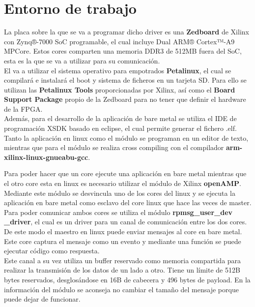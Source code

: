 \documentclass[11pt]{article}
\begin{document}
\section{Entorno de trabajo}

La placa sobre la que se va a programar dicho driver es una \textbf{Zedboard} de Xilinx con Zynq®-7000 SoC programable, el cual incluye Dual ARM® Cortex™-A9 MPCore. Estos cores comparten una memoria DDR3 de 512MB fuera del SoC, esta es la que se va a utilizar para su comunicación.\\

\noindent El va a utilizar el sistema operativo para empotrados \textbf{Petalinux}, el cual se compilará e instalará el boot y sistema de ficheros en un tarjeta SD. Para ello se utilizan las \textbf{Petalinux Tools} proporcionadas por Xilinx, así como el \textbf{Board Support Package} propio de la Zedboard para no tener que definir el hardware de la FPGA. \\

Además, para el desarrollo de la aplicación de bare metal se utiliza el IDE de programación XSDK basado en eclipse, el cual permite generar el fichero .elf. Tanto la aplicación en linux como el módulo se programan en un editor de texto, mientras que para el módulo se realiza cross compiling con el compilador \textbf{arm-xilinx-linux-gnueabu-gcc}.\\

\clearpage

\noindent Para poder hacer que un core ejecute una aplicación en bare metal mientras que el otro core esta en linux es necesario utilizar el módulo de Xilinx \textbf{openAMP}. Mediante este módulo se desvincula uno de los cores del linux y se ejecuta la aplicación en bare metal como esclavo del core linux que hace las veces de master.\\

\noindent Para poder comunicar ambos cores se utiliza el módulo \textbf{rpmsg\_user\_dev \_driver}, el cual es un driver para un canal de comunicación entre los dos cores. De este modo el maestro en linux puede enviar mensajes al core en bare metal. Este core captura el mensaje como un evento y mediante una función se puede ejecutar código como respuesta. \\

\noindent Este canal a su vez utiliza un buffer reservado como memoria compartida para realizar la transmisión de los datos de un lado a otro. Tiene un límite de 512B bytes reservados, desglosándose en 16B de cabecera y 496 bytes de payload. En la información del módulo se aconseja no cambiar el tamaño del mensaje porque puede dejar de funcionar.
\end{document}
